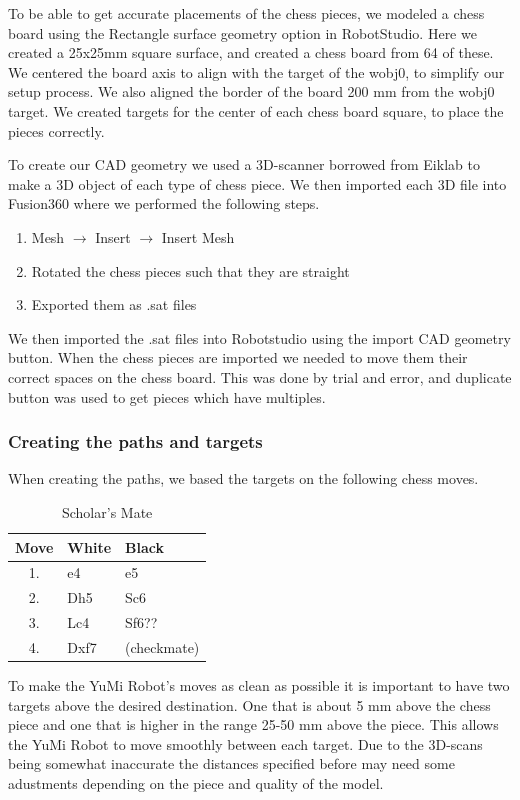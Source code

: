 \documentclass[a4paper,12pt]{article}
\begin{document}
To be able to get accurate placements of the chess pieces, we modeled a chess board using the Rectangle surface geometry option in RobotStudio. Here we created a 25x25mm square surface, and created a chess board from 64 of these. We centered the board axis to align with the target of the wobj0, to simplify our setup process. We also aligned the border of the board 200 mm from the wobj0 target. 
We created targets for the center of each chess board square, to place the pieces correctly. 

To create our CAD geometry we used a 3D-scanner borrowed from Eiklab to make a 3D object of each type of chess piece. We then imported each 3D file into Fusion360 where we performed the following steps.
\begin{enumerate}
    \item Mesh $\rightarrow$ Insert $\rightarrow$ Insert Mesh
    \item Rotated the chess pieces such that they are straight
    \item Exported them as .sat files
\end{enumerate}
We then imported the .sat files into Robotstudio using the import CAD geometry button. When the chess pieces are imported we needed to move them their correct spaces on the chess board. This was done by trial and error, and duplicate button was used to get pieces which have multiples.

\subsubsection{Creating the paths and targets}
\label{sec:Challenge_paths_targets}
When creating the paths, we based the targets on the following chess moves.

\begin{table}[h] %
    \centering
    \begin{tabular}{c l l}
        \hline
        Move & White & Black \\
        \hline
        1. & e4 & e5 \\
        2. & Dh5 & Sc6 \\
        3. & Lc4 & Sf6?? \\
        4. & Dxf7 & (checkmate) \\
        \hline
    \end{tabular}
    \caption{Scholar's Mate}
    \label{tab:chess_moves}
\end{table}
To make the YuMi Robot's moves as clean as possible it is important to have two targets above the desired destination. One that is about 5 mm above the chess piece and one that is higher in the range 25-50 mm above the piece. This allows the YuMi Robot to move smoothly between each target. Due to the 3D-scans being somewhat inaccurate the distances specified before may need some adustments depending on the piece and quality of the model.
\end{document}
